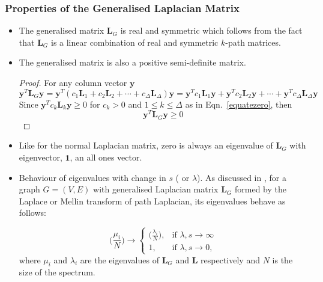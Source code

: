 \documentclass[10pt,a4paper]{article}
\theoremstyle{plain}
\theoremstyle{definition}
\begin{document}
        \subsubsection{Properties of the Generalised Laplacian Matrix }
        \begin{itemize}
        	\item The generalised matrix $\mathbf{L}_G$ is real and symmetric which follows from the fact that $\mathbf{L}_G$ is a linear combination of real and symmetric $k$-path matrices. 
        	
        	\item The generalised matrix is also a positive semi-definite matrix. 
        	\begin{proof}
        		For any column vector $\mathbf{y}$
        		\begin{equation}
        		\mathbf{y}^T \mathbf{L}_{G} \mathbf{y} = \mathbf{y}^T(c_{1}\mathbf{L}_{1} + c_{2}\mathbf{L}_{2} + \cdots + c_{\Delta}\mathbf{L}_{\Delta} )\mathbf{y}
        		= \mathbf{y}^Tc_{1}\mathbf{L}_{1}\mathbf{y} + \mathbf{y}^Tc_{2}\mathbf{L}_{2}\mathbf{y} + \cdots + \mathbf{y}^Tc_{\Delta}\mathbf{L}_{\Delta}\mathbf{y} 
        		\end{equation}
        		Since $\mathbf{y}^Tc_{k}\mathbf{L}_{k}\mathbf{y} \geq 0$ for $c_{k}>0$ and $1 \leq k \leq \Delta$ as in Eqn.~\ref{equatezero}, then
        		\begin{equation}
        		\mathbf{y}^T \mathbf{L}_{G} \mathbf{y} \geq 0	
        		\end{equation}
        	\end{proof}
        	\item Like for the normal Laplacian matrix, zero is always an eigenvalue of $\mathbf{L}_G$ with eigenvector, $\mathbf{1}$, an all ones vector.
        	\item Behaviour of eigenvalues with change in $s$ ( or $\lambda$). As discussed in \citep{estrada2017long}, for a graph $G=(V,E)$  with generalised Laplacian matrix $\mathbf{L}_G$ formed by the Laplace or Mellin transform of path Laplacian, its eigenvalues behave as follows:
        	
        	\begin{equation}
        	\bigg(\frac{\mu_i}{N} \bigg) \longrightarrow  \begin{cases} 
        	\Big(\frac{\lambda_i}{N} \Big), & \mbox{if } \lambda,s \longrightarrow \infty \\
        	1,  &\mbox{if } \lambda,s \longrightarrow 0,
        	\end{cases}
        	\end{equation}
        	where $\mu_i$ and $\lambda_i$ are the eigenvalues of $\mathbf{L}_G$ and $\mathbf{L}$ respectively and $N$ is the size of the spectrum.
        \end{itemize}
    
\end{document}
